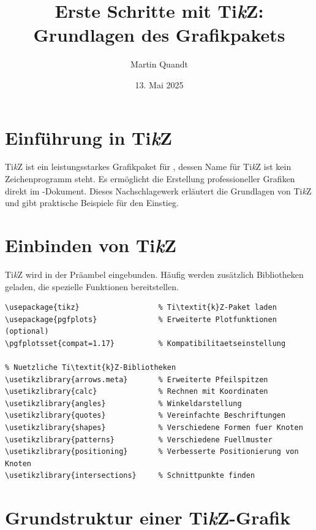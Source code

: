 \documentclass[12pt,a4paper]{article}
\title{Erste Schritte mit Ti\textit{k}Z: Grundlagen des Grafikpakets}
\author{Martin Quandt}
\date{13. Mai 2025}
\begin{document}
\maketitle



\section{Einführung in Ti\textit{k}Z}

Ti\textit{k}Z ist ein leistungsstarkes Grafikpaket für , dessen Name für \glqq{}Ti\textit{k}Z ist kein Zeichenprogramm\grqq{} steht. Es ermöglicht die Erstellung professioneller Grafiken direkt im -Dokument. Dieses Nachschlagewerk erläutert die Grundlagen von Ti\textit{k}Z und gibt praktische Beispiele für den Einstieg.



\section{Einbinden von Ti\textit{k}Z}

Ti\textit{k}Z wird in der Präambel eingebunden. Häufig werden zusätzlich Bibliotheken geladen, die spezielle Funktionen bereitstellen.

\begin{lstlisting}[style=latex]
\usepackage{tikz}                  % Ti\textit{k}Z-Paket laden
\usepackage{pgfplots}              % Erweiterte Plotfunktionen (optional)
\pgfplotsset{compat=1.17}          % Kompatibilitaetseinstellung

% Nuetzliche Ti\textit{k}Z-Bibliotheken
\usetikzlibrary{arrows.meta}       % Erweiterte Pfeilspitzen
\usetikzlibrary{calc}              % Rechnen mit Koordinaten
\usetikzlibrary{angles}            % Winkeldarstellung
\usetikzlibrary{quotes}            % Vereinfachte Beschriftungen
\usetikzlibrary{shapes}            % Verschiedene Formen fuer Knoten
\usetikzlibrary{patterns}          % Verschiedene Fuellmuster
\usetikzlibrary{positioning}       % Verbesserte Positionierung von Knoten
\usetikzlibrary{intersections}     % Schnittpunkte finden
\end{lstlisting}



\section{Grundstruktur einer Ti\textit{k}Z-Grafik}
\end{document}
